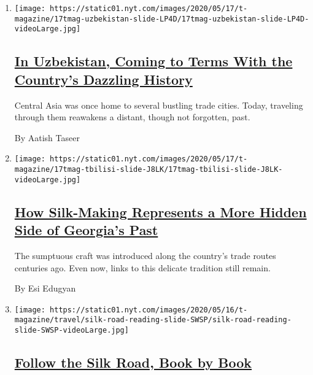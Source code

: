 \begin{enumerate}
\def\labelenumi{\arabic{enumi}.}
\item
  \texttt{[image: https://static01.nyt.com/images/2020/05/17/t-magazine/17tmag-uzbekistan-slide-LP4D/17tmag-uzbekistan-slide-LP4D-videoLarge.jpg]}

  \hypertarget{in-uzbekistan-coming-to-terms-with-the-countrys-dazzling-history}{%
  \subsection{\texorpdfstring{\href{/2020/05/11/t-magazine/uzbekistan-history-silk-road.html}{In
  Uzbekistan, Coming to Terms With the Country's Dazzling
  History}}{In Uzbekistan, Coming to Terms With the Country's Dazzling History}}\label{in-uzbekistan-coming-to-terms-with-the-countrys-dazzling-history}}

  Central Asia was once home to several bustling trade cities. Today,
  traveling through them reawakens a distant, though not forgotten,
  past.

  By Aatish Taseer
\item
  \texttt{[image: https://static01.nyt.com/images/2020/05/17/t-magazine/17tmag-tbilisi-slide-J8LK/17tmag-tbilisi-slide-J8LK-videoLarge.jpg]}

  \hypertarget{how-silk-making-represents-a-more-hidden-side-of-georgias-past}{%
  \subsection{\texorpdfstring{\href{/2020/05/11/t-magazine/silk-road-tbilisi-georgia.html}{How
  Silk-Making Represents a More Hidden Side of Georgia's
  Past}}{How Silk-Making Represents a More Hidden Side of Georgia's Past}}\label{how-silk-making-represents-a-more-hidden-side-of-georgias-past}}

  The sumptuous craft was introduced along the country's trade routes
  centuries ago. Even now, links to this delicate tradition still
  remain.

  By Esi Edugyan
\item
  \texttt{[image: https://static01.nyt.com/images/2020/05/16/t-magazine/travel/silk-road-reading-slide-SWSP/silk-road-reading-slide-SWSP-videoLarge.jpg]}

  \hypertarget{follow-the-silk-road-book-by-book}{%
  \subsection{\texorpdfstring{\href{/2020/05/11/t-magazine/silk-road-reading-list-books-movies.html}{Follow
  the Silk Road, Book by
  Book}}{Follow the Silk Road, Book by Book}}\label{follow-the-silk-road-book-by-book}}


\end{enumerate}
